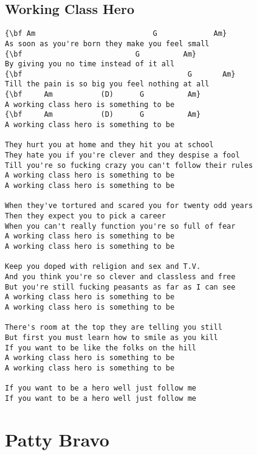 \documentclass[a4paper]{article}
\begin{document}
\subsection{Working Class Hero} %
\label{sub:Working Class Hero}
\begin{Verbatim}[commandchars=\\\{\}]
{\bf Am                           G             Am}
As soon as you're born they make you feel small
{\bf                          G          Am}
By giving you no time instead of it all
{\bf                                      G       Am}
Till the pain is so big you feel nothing at all
{\bf     Am           (D)      G          Am}
A working class hero is something to be
{\bf     Am           (D)      G          Am}
A working class hero is something to be

They hurt you at home and they hit you at school
They hate you if you're clever and they despise a fool
Till you're so fucking crazy you can't follow their rules
A working class hero is something to be
A working class hero is something to be

When they've tortured and scared you for twenty odd years
Then they expect you to pick a career
When you can't really function you're so full of fear
A working class hero is something to be
A working class hero is something to be

Keep you doped with religion and sex and T.V.
And you think you're so clever and classless and free
But you're still fucking peasants as far as I can see
A working class hero is something to be
A working class hero is something to be

There's room at the top they are telling you still
But first you must learn how to smile as you kill
If you want to be like the folks on the hill
A working class hero is something to be
A working class hero is something to be

If you want to be a hero well just follow me
If you want to be a hero well just follow me
\end{Verbatim}
\newpage
\section{Patty Bravo} %
\label{sec:Patty Bravo}
\end{document}
